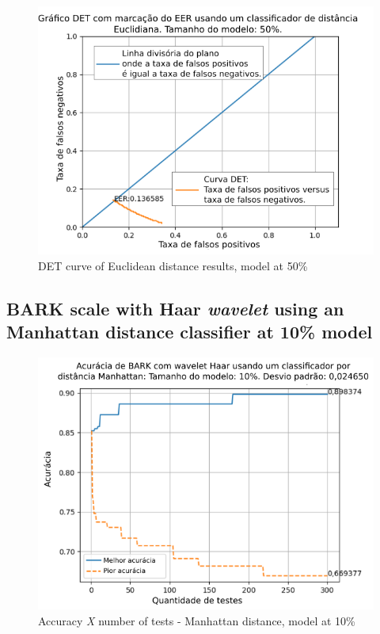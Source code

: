\begin{figure}[!h]
	\centering
	\includegraphics[width=.9\linewidth]{images/results/det/DET_for_classifier_Euclidian_50}
	\caption{DET curve of Euclidean distance results, model at 50\%}
	\label{fig:detforclassifiereuclidian50}
\end{figure}

\subsection{BARK scale with Haar \textit{wavelet} using an Manhattan distance classifier at 10\% model}



\begin{figure}[ht]
	\centering
	\includegraphics[width=\linewidth]{images/results/confusionMatrices/classifier_Manhattan_10.png}
	\caption{Accuracy \textit{X} number of tests - Manhattan distance, model at 10\%}
	\label{fig:classifiermanhattan10}
\end{figure}

